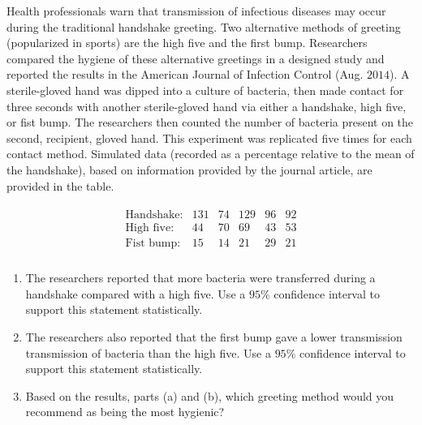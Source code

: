 
\begin{exercise}

Health professionals warn that transmission of infectious diseases may occur during the traditional handshake greeting.
Two alternative methods of greeting (popularized in sports) are the high five and the first bump.
Researchers compared the hygiene of these alternative greetings in a designed study and reported the results in the American Journal of Infection Control (Aug. $2014$).
A sterile-gloved hand was dipped into a culture of bacteria, then made contact for three seconds with another sterile-gloved hand via either a handshake, high five, or fist bump.
The researchers then counted the number of bacteria present on the second, recipient, gloved hand.
This experiment was replicated five times for each contact method.
Simulated data (recorded as a percentage relative to the mean of the handshake), based on information provided by the journal article, are provided in the table.

\begin{align*}
    \begin{array}{llllll}
        \text{Handshake:} & 131 & 74 & 129 & 96 & 92 \\
        \text{High five:} & 44  & 70 & 69  & 43 & 53 \\
        \text{Fist bump:} & 15  & 14 & 21  & 29 & 21 \\
    \end{array}
\end{align*}

\begin{enumerate}[label = (\alph*)]

    \item The researchers reported that more bacteria were transferred during a handshake compared with a high five.
    Use a $95 \%$ confidence interval to support this statement statistically.

    \item The researchers also reported that the first bump gave a lower transmission transmission of bacteria than the high five.
    Use a $95 \%$ confidence interval to support this statement statistically.

    \item Based on the results, parts (a) and (b), which greeting method would you recommend as being the most hygienic?

\end{enumerate}

\end{exercise}


\begin{solution}

\phantom{}

\end{solution}

